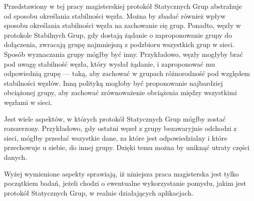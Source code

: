 \documentclass[12pt, twoside, openany]{report}
\begin{document}
Przedstawiony w tej pracy magisterskiej protokół Statycznych Grup abstrahuje od sposobu określania stabilności węzła. Można by zbadać również wpływ sposobu określania stabilności węzła na zachowanie się grup. Ponadto, węzły w protokole Stabilnych Grup, gdy dostają żądanie o zaproponowanie grupy do dołączenia, zwracają grupę najmniejszą z podzbioru wszystkich grup w sieci. Sposób wyznaczania grupy mógłby być inny. Przykładowo, węzły mogłyby brać pod uwagę stabilność węzła, który wysłał żądanie, i zaproponować mu odpowiednią grupę --- taką, aby zachować w grupach różnorodność pod względem stabilności węzłów. Inną polityką mogłoby być proponowanie najbardziej obciążonej grupy, aby zachować zrównoważenie obciążenia między wszystkimi węzłami w sieci.

Jest wiele aspektów, w których protokół Statycznych Grup mógłby zostać rozszerzony. Przykładowo, gdy ostatni węzeł z grupy bezawaryjnie odchodzi z sieci, mógłby przesłać wszystkie dane, za które jest odpowiedzialny i które przechowuje u siebie, do innej grupy. Dzięki temu można by uniknąć utraty części danych.

Wyżej wymienione aspekty sprawiają, iż niniejsza praca magisterska jest tylko początkiem badań, jeżeli chodzi o ewentualne wykorzystanie pomysłu, jakim jest protokół Statycznych Grup, w realnie działających aplikacjach.



\end{document}

